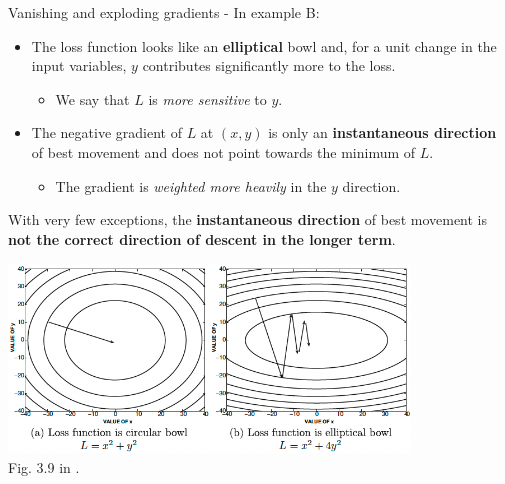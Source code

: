 \begin{frame}[t,allowframebreaks]{
    Vanishing and exploding gradients -}
    In example B:\\
    \begin{itemize}
        \small
        \item The \gls{loss function} looks like an {\bf elliptical} bowl
        and, for a unit change in the input variables,
        $y$ contributes significantly more to the loss.
        \begin{itemize}
            \small
            \item We say that $L$ is {\em more sensitive} to $y$.
        \end{itemize}    
        \item The negative \gls{gradient} of $L$ at $(x,y)$ is only
        an {\bf instantaneous direction} of best movement and does not point
        towards the minimum of $L$.
        \begin{itemize}
            \small
            \item The \gls{gradient} is {\em weighted 
            more heavily} in the $y$ direction.
        \end{itemize}    
    \end{itemize}

    \framebreak


    With very few exceptions, the {\bf instantaneous direction} 
    of best movement is {\bf not the correct direction of 
    descent in the longer term}.\\

    \vspace{0.2cm}

    \begin{center}
        \includegraphics[width=0.80\textwidth]
            {./images/training_issues/aggarwal18_shape_loss_function_grad_descent.png}\\
        {\tiny 
           \color{col:attribution} 
            Fig. 3.9 in \cite{Aggarwal:2018SpringerDL}.\\
        }
    \end{center}        
    

\end{frame}
